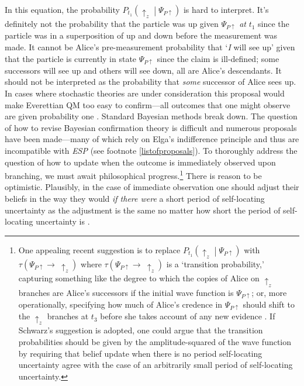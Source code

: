 \documentclass[onecolumn,secnumarabic,amsmath,amssymb,balancelastpage,nofootinbib]{article}
\begin{document}
In this equation, the probability $P_{t_1}\left(\uparrow_z\middle|\Psi_{P\uparrow}\right)$ is hard to interpret.  It's definitely not the probability that the particle was up given $\Psi_{P\uparrow}$ \emph{at} $t_1$ since the particle was in a superposition of up and down before the measurement was made.  It cannot be Alice's pre-measurement probability that `\emph{I} will see up' given that the particle is currently in state $\Psi_{P\uparrow}$ since the claim is ill-defined; some successors will see up and others will see down, all are Alice's descendants.  It should not be interpreted as the probability that \emph{some} successor of Alice sees up.  In cases where stochastic theories are under consideration this proposal would make Everettian QM too easy to confirm---all outcomes that one might observe are given probability one \citep[see][p. 140]{greaves2007b}.  {Standard Bayesian methods break down.}  The question of how to revise Bayesian confirmation theory is difficult and numerous proposals have been made---many of which rely on Elga's indifference principle and thus are incompatible with \emph{ESP} (see footnote \ref{listofproposals}).  To thoroughly address the question of how to update when the outcome is immediately observed upon branching, we must await philosophical progress.\footnote{One appealing recent suggestion is to replace $P_{t_1}\left(\uparrow_z\middle|\Psi_{P\uparrow}\right)$ with $\tau\!\left(\Psi_{P\uparrow}\rightarrow\:\uparrow_z\right)$ where $\tau\!\left(\Psi_{P\uparrow}\rightarrow\:\uparrow_z\right)$ is a `transition probability,' capturing something like the degree to which the copies of Alice on $\uparrow_z$ branches are Alice's successors if the initial wave function is $\Psi_{P\uparrow}$; or, more operationally, specifying how much of Alice's credence in $\Psi_{P\uparrow}$ should shift to the $\uparrow_z$ branches at $t_3$ before she takes account of any new evidence \citep{schwarz}.  If Schwarz's suggestion is adopted, one could argue that the transition probabilities should be given by the amplitude-squared of the wave function by requiring that belief update when there is no period self-locating uncertainty agree with the case of an arbitrarily small period of self-locating uncertainty.} {There is reason} to be optimistic.  {Plausibly,} in the case of immediate observation one should adjust their beliefs in the way they would \emph{if there were} a short period of self-locating uncertainty as the adjustment is the same no matter how short the period of self-locating uncertainty is \citep[p. 107]{tappenden2011}.
\end{document}
